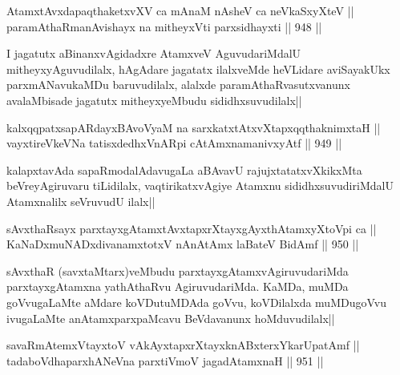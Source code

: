 
\begin{shl}
AtamxtAvxdapaqthaketxvXV ca mAnaM nAsheV ca neVkaSxyXteV || \\
paramAthaRmanAvishayx na mitheyxVti parxsidhayxti ||  948 ||  
\end{shl}

\begin{artha}
I jagatutx aBinanxvAgidadxre AtamxveV AguvudariMdalU mitheyxyAguvudilalx, hAgAdare jagatatx ilalxveMde heVLidare aviSayakUkx parxmANavukaMDu baruvudilalx, alalxde paramAthaRvasutxvanunx avalaMbisade jagatutx mitheyxyeMbudu sididhxsuvudilalx||
\end{artha}


\begin{shl}
kalxqqpatxsapARdayxBAvoV\s yaM na sarxkatxtAtxvXtapxqqthaknimxtaH || \\
vayxtireVkeVNa tatisxdedhxVnARpi cA\s \s tAmxnamanivxyAtf ||  949 ||  
\end{shl}

\begin{artha}
kalapxtavAda sapaRmodalAdavugaLa aBAvavU rajujxtatatxvXkikxMta beVreyAgiruvaru tiLidilalx, vaqtirikatxvAgiye Atamxnu sididhxsuvudiriMdalU Atamxnalilx seVruvudU ilalx||
\end{artha}


\begin{shl}
sAvxthaRsayx parxtayxgAtamxtAvxtapxrXtayxgAyxthAtamxyXtoV\s pi ca || \\
KaNaDxmuNADxdivanamxtotxV nAnAtAmx laBateV BidAmf ||  950 ||  
\end{shl}

\begin{artha}
sAvxthaR (savxtaMtarx)veMbudu parxtayxgAtamxvAgiruvudariMda parxtayxgAtamxna yathAthaRvu AgiruvudariMda. KaMDa, muMDa goVvugaLaMte aMdare koVDutuMDAda goVvu, koVDilalxda muMDugoVvu ivugaLaMte anAtamxparxpaMcavu BeVdavanunx hoMduvudilalx||
\end{artha}

\begin{shl}
savaRmAtemxVtayxtoV vAkAyxtapxrXtayxknABxterxYkarUpatAmf ||  \\
tadaboVdhaparxhANeVna parxtiVmoV jagadAtamxnaH ||  951 ||  
\end{shl}

